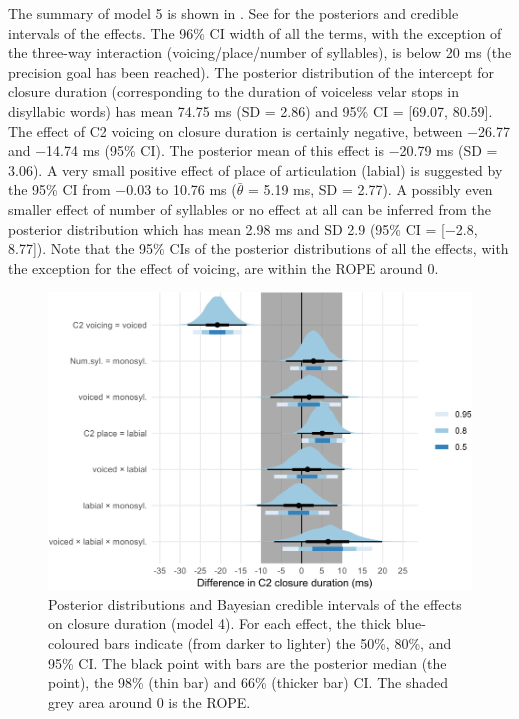 \documentclass[
  12pt,
  a4paper,
  authoryear, 5p]{elsarticle}
\begin{document}
The summary of model 5 is shown in . See
 for the posteriors and credible intervals of
the effects. The 96\% CI width of all the terms, with the exception of
the three-way interaction (voicing/place/number of syllables), is below
20 ms (the precision goal has been reached). The posterior distribution
of the intercept for closure duration (corresponding to the duration of
voiceless velar stops in disyllabic words) has mean 74.75 ms (SD = 2.86)
and 95\% CI = {[}69.07, 80.59{]}. The effect of C2 voicing on closure
duration is certainly negative, between −26.77 and −14.74 ms (95\% CI).
The posterior mean of this effect is −20.79 ms (SD = 3.06). A very small
positive effect of place of articulation (labial) is suggested by the
95\% CI from −0.03 to 10.76 ms (\(\bar{\theta}\) = 5.19 ms, SD = 2.77).
A possibly even smaller effect of number of syllables or no effect at
all can be inferred from the posterior distribution which has mean 2.98
ms and SD 2.9 (95\% CI = {[}−2.8, 8.77{]}). Note that the 95\% CIs of
the posterior distributions of all the effects, with the exception for
the effect of voicing, are within the ROPE around 0.

\begin{figure}
\includegraphics[width=\linewidth]{2019-english-rr_files/figure-latex/clos-5-intervals-1} \caption{Posterior distributions and Bayesian credible intervals of the effects on closure duration (model 4). For each effect, the thick blue-coloured bars indicate (from darker to lighter) the 50\%, 80\%, and 95\% CI. The black point with bars are the posterior median (the point), the 98\% (thin bar) and 66\% (thicker bar) CI. The shaded grey area around 0 is the ROPE.}\label{f:clos-5-intervals}
\end{figure}
\end{document}
